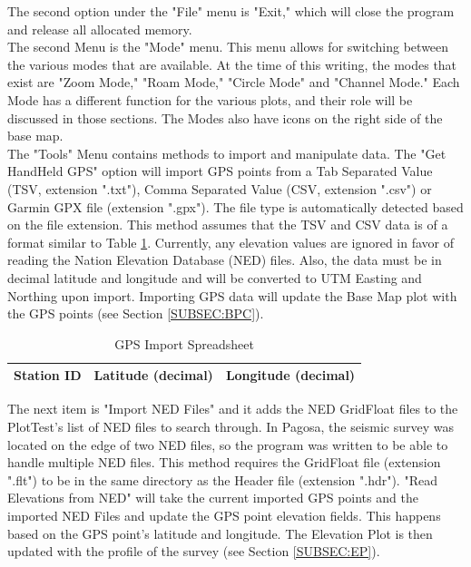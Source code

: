 \documentclass[12pt]{article}
\begin{document}
The second option under the "File" menu is "Exit," which will close the program and release all allocated memory. \\

The second Menu is the "Mode" menu. This menu allows for switching between the various modes that are available. At the time of this writing, the modes that exist are "Zoom Mode," "Roam Mode," "Circle Mode" and "Channel Mode." Each Mode has a different function for the various plots, and their role will be discussed in those sections. The Modes also have icons on the right side of the base map. \\

The "Tools" Menu contains methods to import and manipulate data. The "Get HandHeld GPS" option will import GPS points from a Tab Separated Value (TSV, extension ".txt"), Comma Separated Value (CSV, extension ".csv") or Garmin GPX file (extension ".gpx"). The file type is automatically detected based on the file extension. This method assumes that the TSV and CSV data is of a format similar to Table \ref{TAB:GPS2}. Currently, any elevation values are ignored in favor of reading the Nation Elevation Database (NED) files. Also, the data must be in decimal latitude and longitude and will be converted to UTM Easting and Northing upon import. Importing GPS data will update the Base Map plot with the GPS points (see Section \ref{SUBSEC:BPC}).\\

\begin{table}[h]
\caption{GPS Import Spreadsheet}
\centering
\begin{tabular}{ c | c | c}
  \hline                  
  Station ID & Latitude (decimal) & Longitude (decimal) \\
  \hline
\end{tabular}
\label{TAB:GPS2}
\end{table}

The next item is "Import NED Files" and it adds the NED GridFloat files to the PlotTest's list of NED files to search through. In Pagosa, the seismic survey was located on the edge of two NED files, so the program was written to be able to handle multiple NED files. This method requires the GridFloat file (extension ".flt") to be in the same directory as the Header file (extension ".hdr"). "Read Elevations from NED" will take the current imported GPS points and the imported NED Files and update the GPS point elevation fields. This happens based on the GPS point's latitude and longitude. The Elevation Plot is then updated with the profile of the survey (see Section \ref{SUBSEC:EP}). \\
\end{document}
